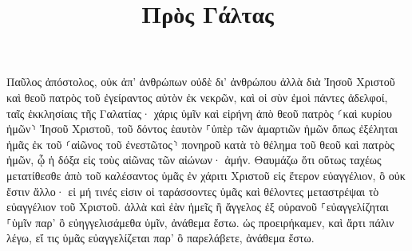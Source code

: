 \documentclass{openreader}
\title{Πρὸς Γάλτας}
\date{}
\begin{document}
\maketitle
\raggedbottom 
\fontsize{16pt}{24pt}\selectfont


Παῦλος ἀπόστολος, οὐκ ἀπ’ ἀνθρώπων οὐδὲ δι’ ἀνθρώπου ἀλλὰ διὰ Ἰησοῦ Χριστοῦ καὶ θεοῦ πατρὸς τοῦ ἐγείραντος αὐτὸν ἐκ νεκρῶν, 
καὶ οἱ σὺν ἐμοὶ πάντες ἀδελφοί, ταῖς ἐκκλησίαις τῆς Γαλατίας· 
χάρις ὑμῖν καὶ εἰρήνη ἀπὸ θεοῦ πατρὸς ⸂καὶ κυρίου ἡμῶν⸃ Ἰησοῦ Χριστοῦ, 
τοῦ δόντος ἑαυτὸν ⸀ὑπὲρ τῶν ἁμαρτιῶν ἡμῶν ὅπως ἐξέληται ἡμᾶς ἐκ τοῦ ⸂αἰῶνος τοῦ ἐνεστῶτος⸃ πονηροῦ κατὰ τὸ θέλημα τοῦ θεοῦ καὶ πατρὸς ἡμῶν, 
ᾧ ἡ δόξα εἰς τοὺς αἰῶνας τῶν αἰώνων· ἀμήν. 
Θαυμάζω ὅτι οὕτως ταχέως μετατίθεσθε ἀπὸ τοῦ καλέσαντος ὑμᾶς ἐν χάριτι Χριστοῦ εἰς ἕτερον εὐαγγέλιον, 
ὃ οὐκ ἔστιν ἄλλο· εἰ μή τινές εἰσιν οἱ ταράσσοντες ὑμᾶς καὶ θέλοντες μεταστρέψαι τὸ εὐαγγέλιον τοῦ Χριστοῦ. 
ἀλλὰ καὶ ἐὰν ἡμεῖς ἢ ἄγγελος ἐξ οὐρανοῦ ⸀εὐαγγελίζηται ⸀ὑμῖν παρ’ ὃ εὐηγγελισάμεθα ὑμῖν, ἀνάθεμα ἔστω. 
ὡς προειρήκαμεν, καὶ ἄρτι πάλιν λέγω, εἴ τις ὑμᾶς εὐαγγελίζεται παρ’ ὃ παρελάβετε, ἀνάθεμα ἔστω. 
\end{document}
